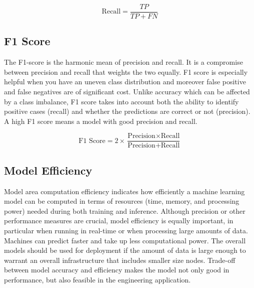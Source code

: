 \begin{equation}
\text{Recall} = \frac{TP}{TP + FN}
\end{equation}

\subsection{\textbf{F1 Score}}
The F1-score is the harmonic mean of precision and recall. It is a compromise between precision and recall that weights the two equally. F1 score is especially helpful when you have an uneven class distribution and moreover false positive and false negatives are of significant cost. Unlike accuracy which can be affected by a class imbalance, F1 score takes into account both the ability to identify positive cases (recall) and whether the predictions are correct or not (precision). A high F1 score means a model with good precision and recall.
 

\begin{equation}
\text{F1 Score} = 2 \times \frac{\text{Precision} \times \text{Recall}}{\text{Precision} + \text{Recall}}
\end{equation}




\subsection{Model Efficiency}
Model area computation efficiency indicates how efficiently a machine learning model can be computed in terms of resources (time, memory, and processing power) needed during both training and inference. Although precision or other performance measures are crucial, model efficiency is equally important, in particular when running in real-time or when processing large amounts of data. Machines can predict faster and take up less computational power. The overall models should be used for deployment if the amount of data is large enough to warrant an overall infrastructure that includes smaller size nodes. Trade-off between model accuracy and efficiency makes the model not only good in performance, but also feasible in the engineering application.